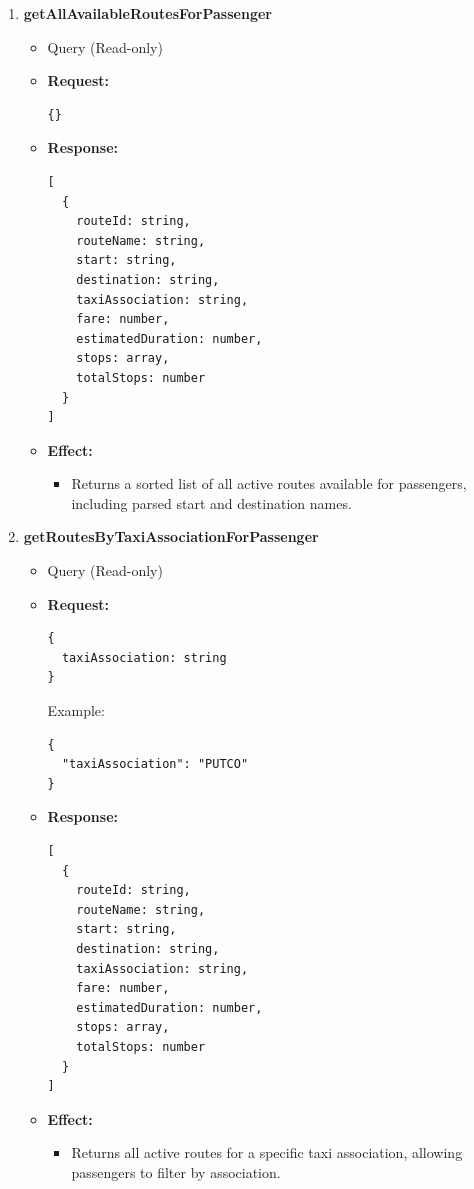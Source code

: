 \documentclass[a4paper,12pt]{article}
\begin{document}
\begin{enumerate}
  \item \textbf{getAllAvailableRoutesForPassenger}
    \begin{itemize}
      \item Query (Read-only)
      \item \textbf{Request:}
      \begin{verbatim}
{}
      \end{verbatim}
      \item \textbf{Response:}
      \begin{verbatim}
[
  {
    routeId: string,
    routeName: string,
    start: string,
    destination: string,
    taxiAssociation: string,
    fare: number,
    estimatedDuration: number,
    stops: array,
    totalStops: number
  }
]
      \end{verbatim}
      \item \textbf{Effect:}
      \begin{itemize}
        \item Returns a sorted list of all active routes available for passengers, including parsed start and destination names.
      \end{itemize}
    \end{itemize}

  \item \textbf{getRoutesByTaxiAssociationForPassenger}
    \begin{itemize}
      \item Query (Read-only)
      \item \textbf{Request:}
      \begin{verbatim}
{
  taxiAssociation: string
}
      \end{verbatim}
      Example:
      \begin{verbatim}
{
  "taxiAssociation": "PUTCO"
}
      \end{verbatim}
      \item \textbf{Response:}
      \begin{verbatim}
[
  {
    routeId: string,
    routeName: string,
    start: string,
    destination: string,
    taxiAssociation: string,
    fare: number,
    estimatedDuration: number,
    stops: array,
    totalStops: number
  }
]
      \end{verbatim}
      \item \textbf{Effect:}
      \begin{itemize}
        \item Returns all active routes for a specific taxi association, allowing passengers to filter by association.
      \end{itemize}
    \end{itemize}


\end{enumerate}
\end{document}
